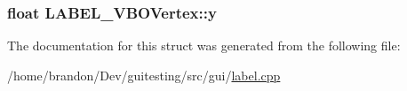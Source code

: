 \hypertarget{struct_l_a_b_e_l___v_b_o_vertex_e2ed3b0c3807f5e4e637a5d6b0873fbe}{
\subsubsection[{y}]{\setlength{\rightskip}{0pt plus 5cm}float {\bf LABEL\_\-VBOVertex::y}}}
\label{struct_l_a_b_e_l___v_b_o_vertex_e2ed3b0c3807f5e4e637a5d6b0873fbe}




The documentation for this struct was generated from the following file:\begin{CompactItemize}
\item 
/home/brandon/Dev/guitesting/src/gui/\hyperlink{label_8cpp}{label.cpp}\end{CompactItemize}
